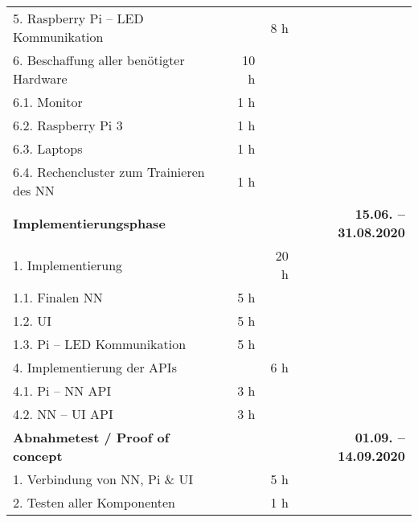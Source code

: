 \begin{tabularx}{\textwidth}{Xrrr}
5. Raspberry Pi -- LED Kommunikation &    &    8 h   &  \\
\rowcolor{odd}6. Beschaffung aller ben\"otigter Hardware & 10 h   &       &  \\
\hspace{1cm}6.1. Monitor & 1 h   &       &  \\
\rowcolor{odd}\hspace{1cm}6.2. Raspberry Pi 3 & 1 h   &       &  \\
\hspace{1cm}6.3. Laptops & 1 h   &       &  \\
\rowcolor{odd}\hspace{1cm}6.4. Rechencluster zum Trainieren des NN & 1 h   &       &  \\
\rowcolor{heading}\textbf{Implementierungsphase} & \textbf{} & \textbf{} & \textbf{15.06. -- 31.08.2020} \\
1. Implementierung &       & 20 h   &  \\
\rowcolor{odd}\hspace{1cm}1.1. Finalen NN &   5 h     &   &  \\
\hspace{1cm}1.2. UI &   5 h  &       &  \\
\rowcolor{odd}\hspace{1cm}1.3. Pi -- LED Kommunikation &    5 h    &   &  \\
4. Implementierung der APIs &       & 6 h   &  \\
\rowcolor{odd}\hspace{1cm}4.1. Pi -- NN API & 3 h   &       &  \\
\hspace{1cm}4.2. NN -- UI API & 3 h   &       &  \\
\rowcolor{heading}\textbf{Abnahmetest / Proof of concept} & \textbf{} & \textbf{} & \textbf{01.09. -- 14.09.2020} \\
1. Verbindung von NN, Pi \& UI &       & 5 h   &  \\
\rowcolor{odd}2. Testen aller Komponenten &       & 1 h   &  \\

\end{tabularx}
